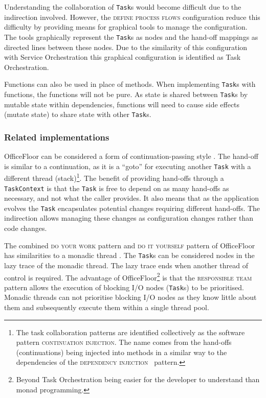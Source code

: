 \documentclass[prodmode]{style/acmlarge}
\begin{document}
Understanding the collaboration of \texttt{Task}s would become difficult due to
the indirection involved.  However, the \textsc{define process flows}
configuration reduce this difficulty by providing means for graphical tools to
manage the configuration.  The tools graphically represent the \texttt{Task}s as
nodes and the hand-off mappings as directed lines between these nodes.  Due to
the similarity of this configuration with Service Orchestration this graphical
configuration is identified as Task Orchestration.

Functions can also be used in place of methods.  When implementing
\texttt{Task}s with functions, the functions will not be pure.  As state is
shared between \texttt{Task}s by mutable state within dependencies, functions
will need to cause side effects (mutate state) to share state with other
\texttt{Task}s.



\subsubsection*{Related implementations}

OfficeFloor can be considered a form of continuation-passing style
\cite{continuations}.  The hand-off is similar to a continuation, as it is a
``goto'' for executing another \texttt{Task} with a different thread
(stack)\footnote{The task collaboration patterns are identified collectively as
the software pattern \textsc{continuation injection}.  The name comes from the
hand-offs (continuations) being injected into methods in a similar way to the
dependencies of the \textsc{dependency injection}~\cite{ioc} pattern.}.  The
benefit of providing hand-offs through a \texttt{TaskContext} is that the
\texttt{Task} is free to depend on as many hand-offs as necessary, and not what
the caller provides.  It also means that as the application evolves the
\texttt{Task} encapsulates potential changes requiring different hand-offs.  The
indirection allows managing these changes as configuration changes rather than
code changes.

The combined \textsc{do your work} pattern and \textsc{do it yourself} pattern
of OfficeFloor has similarities to a monadic thread \cite{monadic-thread}.  The
\texttt{Task}s can be considered nodes in the lazy trace of the monadic thread. 
The lazy trace ends when another thread of control is required.  The advantage of
OfficeFloor\footnote{Beyond Task Orchestration being easier for the developer to
understand than monad programming.} is that the \textsc{responsible team}
pattern allows the execution of blocking I/O nodes (\texttt{Task}s) to be
prioritised.  Monadic threads can not prioritise blocking I/O nodes as they know
little about them and subsequently execute them within a single thread pool.
\end{document}

